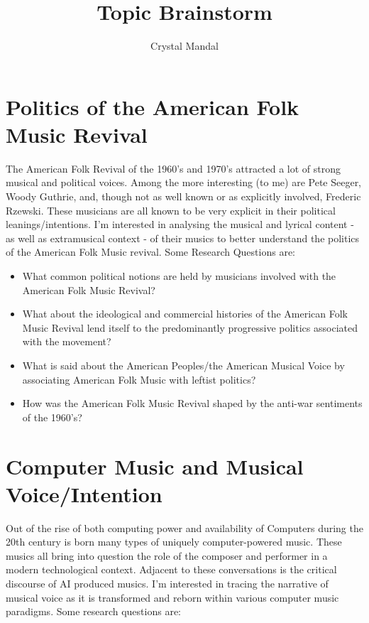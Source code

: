 \documentclass[14pt, letterpaper]{article}
\title{ \vspace*{-72pt} Topic Brainstorm }
\author{Crystal Mandal}
\date{}
\begin{document}
\maketitle

\section*{Politics of the American Folk Music Revival}
The American Folk Revival of the 1960's and 1970's attracted a lot of 
strong musical and political voices. Among the more interesting (to me) 
are Pete Seeger, Woody Guthrie, and, though not as well known or as 
explicitly involved, Frederic Rzewski. These musicians are all known 
to be very explicit in their political leanings/intentions. I'm interested 
in analysing the musical and lyrical content - as well as extramusical context - 
of their musics to better understand the politics of the American Folk Music 
revival. Some Research Questions are:
\begin{itemize}

	\item What common political notions are held by musicians involved 
	with the American Folk Music Revival?
	
	\item What about the ideological and commercial histories of the 
	American Folk Music Revival lend itself to the predominantly 
	progressive politics associated with the movement?
	
	\item What is said about the American Peoples/the American Musical Voice 
	by associating American Folk Music with leftist politics?
	
	\item How was the American Folk Music Revival shaped by the anti-war 
	sentiments of the 1960's?

\end{itemize}

\clearpage

\section*{Computer Music and Musical Voice/Intention}
Out of the rise of both computing power and availability of Computers during the 
20th century is born many types of uniquely computer-powered music. These musics 
all bring into question the role of the composer and performer in a modern 
technological context. Adjacent to these conversations is the critical discourse 
of AI produced musics. I'm interested in tracing the narrative of musical voice 
as it is transformed and reborn within various computer music paradigms. Some 
research questions are:
\end{document}

